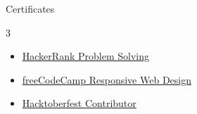 \documentclass{resume}
\begin{document}
\begin{rSection}{Certificates}
\begin{multicols}{3}
\begin{itemize}
  \item \href{https://www.hackerrank.com/certificates/73bb80c83be4}{HackerRank Problem Solving}
  \item \href{https://www.freecodecamp.org/certification/Roshan_kumar7989/responsive-web-design}{freeCodeCamp Responsive Web Design}
  \item \href{https://tree-nation.com/certificate/6525e97fbca2d}{Hacktoberfest Contributor}
\end{itemize}
\end{multicols}
\end{rSection}
\end{document}
